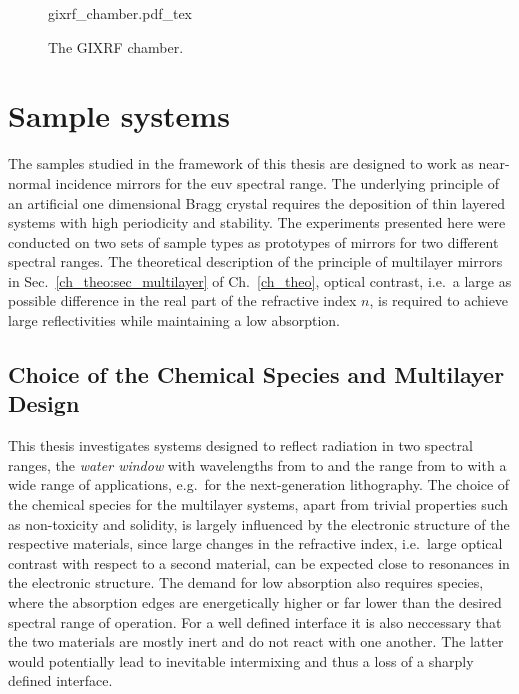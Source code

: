 \begin{figure}[htb]
    \def\svgwidth{\textwidth}
    {gixrf_chamber.pdf_tex}
    \caption[The GIXRF chamber.]{The GIXRF chamber.}
    \label{ch_exp:fig_gixrf_chamber}
\end{figure}

\section{Sample systems}
The samples studied in the framework of this thesis are designed to work as near-normal incidence mirrors for the \gls{euv} spectral range. The underlying principle of an artificial one dimensional Bragg crystal requires the deposition of thin layered systems with high periodicity and stability. The experiments presented here were conducted on two sets of sample types as prototypes of mirrors for two different spectral ranges. The theoretical description of the principle of multilayer mirrors in Sec.~\ref{ch_theo:sec_multilayer} of Ch.~\ref{ch_theo}, optical contrast, i.e.~a large as possible difference in the real part of the refractive index $n$, is required to achieve large reflectivities while maintaining a low absorption.



\subsection{Choice of the Chemical Species and Multilayer Design}
\label{ch_exp:sec_multilayer_design}
This thesis investigates systems designed to reflect radiation in two spectral ranges, the \emph{water window} with wavelengths from  to  and the range from  to  with a wide range of applications, e.g.~for the next-generation lithography. The choice of the chemical species for the multilayer systems, apart from trivial properties such as non-toxicity and solidity, is largely influenced by the electronic structure of the respective materials, since large changes in the refractive index, i.e.~large optical contrast with respect to a second material, can be expected close to resonances in the electronic structure. The demand for low absorption also requires species, where the absorption edges are energetically higher or far lower than the desired spectral range of operation. For a well defined interface it is also neccessary that the two materials are mostly inert and do not react with one another. The latter would potentially lead to inevitable intermixing and thus a loss of a sharply defined interface.

